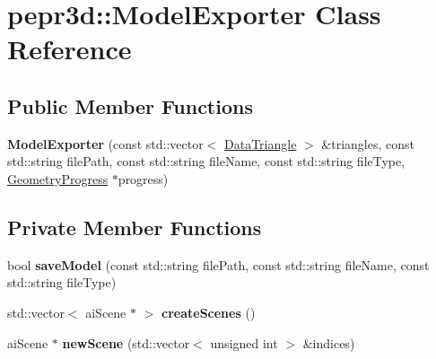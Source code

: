 \hypertarget{classpepr3d_1_1_model_exporter}{}\section{pepr3d\+::Model\+Exporter Class Reference}
\label{classpepr3d_1_1_model_exporter}
\subsection*{Public Member Functions}
\begin{DoxyCompactItemize}
\item 
\mbox{\label{classpepr3d_1_1_model_exporter_a4ae3dd170d168c2aaaa1a10fa67186e5}} 
{\bfseries Model\+Exporter} (const std\+::vector$<$ \mbox{\hyperlink{classpepr3d_1_1_data_triangle}{Data\+Triangle}} $>$ \&triangles, const std\+::string file\+Path, const std\+::string file\+Name, const std\+::string file\+Type, \mbox{\hyperlink{structpepr3d_1_1_geometry_progress}{Geometry\+Progress}} $\ast$progress)
\end{DoxyCompactItemize}
\subsection*{Private Member Functions}
\begin{DoxyCompactItemize}
\item 
\mbox{\label{classpepr3d_1_1_model_exporter_a04954ea018cc315c2c110fbbf6b83b56}} 
bool {\bfseries save\+Model} (const std\+::string file\+Path, const std\+::string file\+Name, const std\+::string file\+Type)
\item 
\mbox{\label{classpepr3d_1_1_model_exporter_a5bc63538b453a63f8c8ebf61334c9b43}} 
std\+::vector$<$ ai\+Scene $\ast$ $>$ {\bfseries create\+Scenes} ()
\item 
\mbox{\label{classpepr3d_1_1_model_exporter_a070fbac0efed0e6c99f03b35f4f14a2b}} 
ai\+Scene $\ast$ {\bfseries new\+Scene} (std\+::vector$<$ unsigned int $>$ \&indices)
\end{DoxyCompactItemize}
